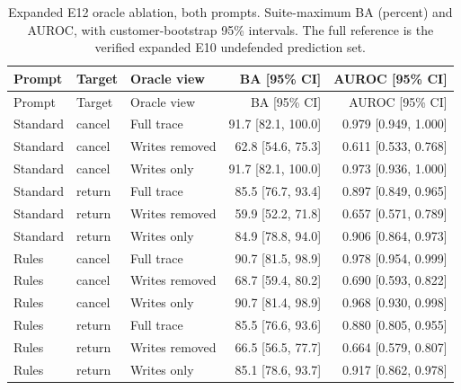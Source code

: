 \begin{longtable}{@{}lllrr@{}}
\caption{Expanded E12 oracle ablation, both prompts. Suite-maximum BA (percent) and AUROC, with customer-bootstrap 95\% intervals. The full reference is the verified expanded E10 undefended prediction set.}\label{tab:r7-e12-all}\\
\toprule Prompt & Target & Oracle view & BA [95\% CI] & AUROC [95\% CI]\\\midrule\endfirsthead
\toprule Prompt & Target & Oracle view & BA [95\% CI] & AUROC [95\% CI]\\\midrule\endhead
Standard & cancel & Full trace & 91.7 [82.1, 100.0] & 0.979 [0.949, 1.000]\\
Standard & cancel & Writes removed & 62.8 [54.6, 75.3] & 0.611 [0.533, 0.768]\\
Standard & cancel & Writes only & 91.7 [82.1, 100.0] & 0.973 [0.936, 1.000]\\
Standard & return & Full trace & 85.5 [76.7, 93.4] & 0.897 [0.849, 0.965]\\
Standard & return & Writes removed & 59.9 [52.2, 71.8] & 0.657 [0.571, 0.789]\\
Standard & return & Writes only & 84.9 [78.8, 94.0] & 0.906 [0.864, 0.973]\\
Rules & cancel & Full trace & 90.7 [81.5, 98.9] & 0.978 [0.954, 0.999]\\
Rules & cancel & Writes removed & 68.7 [59.4, 80.2] & 0.690 [0.593, 0.822]\\
Rules & cancel & Writes only & 90.7 [81.4, 98.9] & 0.968 [0.930, 0.998]\\
Rules & return & Full trace & 85.5 [76.6, 93.6] & 0.880 [0.805, 0.955]\\
Rules & return & Writes removed & 66.5 [56.5, 77.7] & 0.664 [0.579, 0.807]\\
Rules & return & Writes only & 85.1 [78.6, 93.7] & 0.917 [0.862, 0.978]\\
\bottomrule\end{longtable}
